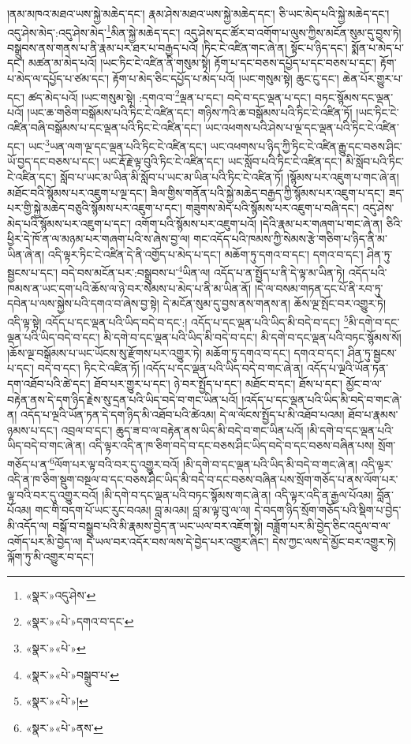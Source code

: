 །ནམ་མཁའ་མཐའ་ཡས་སྐྱེ་མཆེད་དང་། རྣམ་ཤེས་མཐའ་ཡས་སྐྱེ་མཆེད་དང་། ཅི་ཡང་མེད་པའི་སྐྱེ་མཆེད་དང་། འདུ་ཤེས་མེད་:འདུ་ཤེས་མེད་\footnote{«སྣར་»འདུ་ཤེས་}མིན་སྐྱེ་མཆེད་དང་། འདུ་ཤེས་དང་ཚོར་བ་འགོག་པ་ལུས་ཀྱིས་མངོན་སུམ་དུ་བྱས་ཏེ། བསྒྲུབས་ནས་གནས་པ་ནི་རྣམ་པར་ཐར་པ་བརྒྱད་པའོ། །ཏིང་ངེ་འཛིན་གང་ཞེ་ན། སྟོང་པ་ཉིད་དང་། སྨོན་པ་མེད་པ་དང་། མཚན་མ་མེད་པའོ། །ཡང་ཏིང་ངེ་འཛིན་ནི་གསུམ་སྟེ། རྟོག་པ་དང་བཅས་དཔྱོད་པ་དང་བཅས་པ་དང་། རྟོག་པ་མེད་ལ་དཔྱོད་པ་ཙམ་དང་། རྟོག་པ་མེད་ཅིང་དཔྱོད་པ་མེད་པའོ། །ཡང་གསུམ་སྟེ། ཆུང་ངུ་དང་། ཆེན་པོར་གྱུར་པ་དང་། ཚད་མེད་པའོ། །ཡང་གསུམ་སྟེ། :དགའ་བ་\footnote{«སྣར་»«པེ་»དགའ་བ་དང་}ལྡན་པ་དང་། བདེ་བ་དང་ལྡན་པ་དང་། བཏང་སྙོམས་དང་ལྡན་པའོ། །ཡང་ཆ་གཅིག་བསྒོམས་པའི་ཏིང་ངེ་འཛིན་དང་། གཉིས་ཀའི་ཆ་བསྒོམས་པའི་ཏིང་ངེ་འཛིན་ཏོ། །ཡང་ཏིང་ངེ་འཛིན་བཞི་བསྒོམས་པ་དང་ལྡན་པའི་ཏིང་ངེ་འཛིན་དང་། ཡང་འཕགས་པའི་ཤེས་པ་ལྔ་དང་ལྡན་པའི་ཏིང་ངེ་འཛིན་དང་། ཡང་\footnote{«སྣར་»«པེ་»}ཡན་ལག་ལྔ་དང་ལྡན་པའི་ཏིང་ངེ་འཛིན་དང་། ཡང་འཕགས་པ་ཉིད་ཀྱི་ཏིང་ངེ་འཛིན་རྒྱུ་དང་བཅས་ཤིང་ཡོ་བྱད་དང་བཅས་པ་དང་། ཡང་རྡོ་རྗེ་ལྟ་བུའི་ཏིང་ངེ་འཛིན་དང་། ཡང་སློབ་པའི་ཏིང་ངེ་འཛིན་དང་། མི་སློབ་པའི་ཏིང་ངེ་འཛིན་དང་། སློབ་པ་ཡང་མ་ཡིན་མི་སློབ་པ་ཡང་མ་ཡིན་པའི་ཏིང་ངེ་འཛིན་ཏོ། །སྙོམས་པར་འཇུག་པ་གང་ཞེ་ན། མཐོང་བའི་སྙོམས་པར་འཇུག་པ་ལྔ་དང་། ཟིལ་གྱིས་གནོན་པའི་སྐྱེ་མཆེད་བརྒྱད་ཀྱི་སྙོམས་པར་འཇུག་པ་དང་། ཟད་པར་གྱི་སྐྱེ་མཆེད་བཅུའི་སྙོམས་པར་འཇུག་པ་དང་། གཟུགས་མེད་པའི་སྙོམས་པར་འཇུག་པ་བཞི་དང་། འདུ་ཤེས་མེད་པའི་སྙོམས་པར་འཇུག་པ་དང་། འགོག་པའི་སྙོམས་པར་འཇུག་པའོ། །དེའི་རྣམ་པར་གཞག་པ་གང་ཞེ་ན། ཅིའི་ཕྱིར་དེ་ཁོ་ན་ལ་མཉམ་པར་གཞག་པའི་ས་ཞེས་བྱ་ལ། གང་འདོད་པའི་ཁམས་ཀྱི་སེམས་རྩེ་གཅིག་པ་ཉིད་ནི་མ་ཡིན་ཞེ་ན། འདི་ལྟར་ཏིང་ངེ་འཛིན་དེ་ནི་འགྱོད་པ་མེད་པ་དང་། མཆོག་ཏུ་དགའ་བ་དང་། དགའ་བ་དང་། ཤིན་ཏུ་སྦྱངས་པ་དང་། བདེ་བས་མངོན་པར་:བསྒྲུབས་པ་\footnote{«སྣར་»«པེ་»བསྒྲུབ་པ་}ཡིན་ལ། འདོད་པ་ན་སྤྱོད་པ་ནི་དེ་ལྟ་མ་ཡིན་ཏེ། འདོད་པའི་ཁམས་ན་ཡང་དག་པའི་ཆོས་ལ་ཉེ་བར་སེམས་པ་མེད་པ་ནི་མ་ཡིན་ནོ། །དེ་ལ་བསམ་གཏན་དང་པོ་ནི་རབ་ཏུ་དབེན་པ་ལས་སྐྱེས་པའི་དགའ་བ་ཞེས་བྱ་སྟེ། དེ་མངོན་སུམ་དུ་བྱས་ནས་གནས་ན། ཆོས་ལྔ་སྤོང་བར་འགྱུར་ཏེ། འདི་ལྟ་སྟེ། འདོད་པ་དང་ལྡན་པའི་ཡིད་བདེ་བ་དང་:། འདོད་པ་དང་ལྡན་པའི་ཡིད་མི་བདེ་བ་དང་། \footnote{«སྣར་»«པེ་»།  }མི་དགེ་བ་དང་ལྡན་པའི་ཡིད་བདེ་བ་དང་། མི་དགེ་བ་དང་ལྡན་པའི་ཡིད་མི་བདེ་བ་དང་། མི་དགེ་བ་དང་ལྡན་པའི་བཏང་སྙོམས་སོ། །ཆོས་ལྔ་བསྒོམས་པ་ཡང་ཡོངས་སུ་རྫོགས་པར་འགྱུར་ཏེ། མཆོག་ཏུ་དགའ་བ་དང་། དགའ་བ་དང་། ཤིན་ཏུ་སྦྱངས་པ་དང་། བདེ་བ་དང་། ཏིང་ངེ་འཛིན་ཏོ། །འདོད་པ་དང་ལྡན་པའི་ཡིད་བདེ་བ་གང་ཞེ་ན། འདོད་པ་ལྔའི་ཡོན་ཏན་དག་འཐོབ་པའི་ཚེ་དང་། ཐོབ་པར་གྱུར་པ་དང་། ཉེ་བར་སྤྱོད་པ་དང་། མཐོང་བ་དང་། ཐོས་པ་དང་། མྱོང་བ་ལ་བརྟེན་ནས་དེ་དག་ཉིད་རྗེས་སུ་དྲན་པའི་ཡིད་བདེ་བ་གང་ཡིན་པའོ། །འདོད་པ་དང་ལྡན་པའི་ཡིད་མི་བདེ་བ་གང་ཞེ་ན། འདོད་པ་ལྔའི་ཡོན་ཏན་དེ་དག་ཉིད་མི་འཐོབ་པའི་ཚེའམ། དེ་ལ་ལོངས་སྤྱོད་པ་མི་འཐོབ་པའམ། ཐོབ་པ་རྣམས་ཉམས་པ་དང་། འབྲལ་བ་དང་། ཆུད་ཟ་བ་ལ་བརྟེན་ནས་ཡིད་མི་བདེ་བ་གང་ཡིན་པའོ། །མི་དགེ་བ་དང་ལྡན་པའི་ཡིད་བདེ་བ་གང་ཞེ་ན། འདི་ལྟར་འདི་ན་ཁ་ཅིག་བདེ་བ་དང་བཅས་ཤིང་ཡིད་བདེ་བ་དང་བཅས་བཞིན་པས། སྲོག་གཅོད་པ་ན་\footnote{«སྣར་»«པེ་»ནས་}ལོག་པར་ལྟ་བའི་བར་དུ་འགྱུར་བའོ། །མི་དགེ་བ་དང་ལྡན་པའི་ཡིད་མི་བདེ་བ་གང་ཞེ་ན། འདི་ལྟར་འདི་ན་ཁ་ཅིག་སྡུག་བསྔལ་བ་དང་བཅས་ཤིང་ཡིད་མི་བདེ་བ་དང་བཅས་བཞིན་པས་སྲོག་གཅོད་པ་ནས་ལོག་པར་ལྟ་བའི་བར་དུ་འགྱུར་བའོ། །མི་དགེ་བ་དང་ལྡན་པའི་བཏང་སྙོམས་གང་ཞེ་ན། འདི་ལྟར་འདི་ན་རྒྱལ་པོའམ། བློན་པོའམ། གང་གི་བདག་པོ་ཡང་རུང་བའམ། བླ་མའམ། བླ་མ་ལྟ་བུ་ལ་ལ། དེ་བདག་ཉིད་སྲོག་གཅོད་པའི་སྡིག་པ་བྱེད་མི་འདོད་ལ། བསྒོ་བ་བསྒྲུབ་པའི་མི་རྣམས་བྱེད་ན་ཡང་ཡལ་བར་འཇོག་སྟེ། བཟློག་པར་མི་བྱེད་ཅིང་འདུལ་བ་ལ་འགོད་པར་མི་བྱེད་ལ། དེ་ཡལ་བར་འདོར་བས་ལས་དེ་བྱེད་པར་འགྱུར་ཞིང་། དེས་ཀྱང་ལས་དེ་མྱོང་བར་འགྱུར་ཏེ། ལྐོག་ཏུ་མི་འགྱུར་བ་དང་། 
